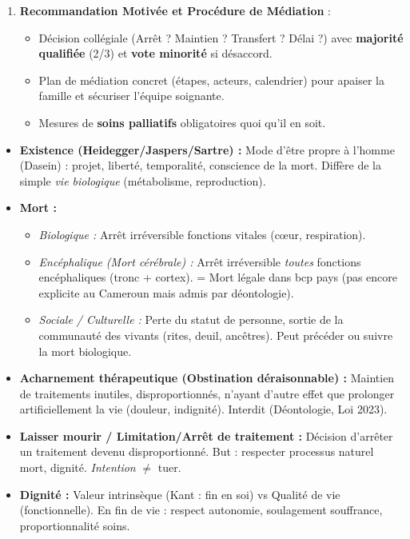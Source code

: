 \documentclass[11pt]{article}
\newcounter{popsec}
\newcounter{popsub}
\newcommand{\courssub}[1]{%
  \stepcounter{popsub}%
  \par\vspace{9pt}\noindent{\popxbold\fontsize{11.5}{13}\selectfont\color{popink}{\color{poporange}\thepopsec.\thepopsub}\hspace{6pt}#1}\par\nopagebreak\vspace{4pt}
}
\begin{document}
\begin{enumerate}
\begin{itemize}
        \item Proposer une \textbf{herméneutique du dialogue} : comment articuler droit positif et droit coutumier sans nier l'un ni l'autre ?
    \end{itemize}
    \item \textbf{Recommandation Motivée et Procédure de Médiation} : 
    \begin{itemize}
        \item Décision collégiale (Arrêt ? Maintien ? Transfert ? Délai ?) avec \textbf{majorité qualifiée} (2/3) et \textbf{vote minorité} si désaccord.
        \item Plan de médiation concret (étapes, acteurs, calendrier) pour apaiser la famille et sécuriser l'équipe soignante.
        \item Mesures de \textbf{soins palliatifs} obligatoires quoi qu'il en soit.
    \end{itemize}
\end{enumerate}

\courssub{Ressources à mobiliser}
\begin{definition}
\begin{itemize}
    \item \textbf{Existence (Heidegger/Jaspers/Sartre) :} Mode d'être propre à l'homme (Dasein) : projet, liberté, temporalité, conscience de la mort. Diffère de la simple \emph{vie biologique} (métabolisme, reproduction).
    \item \textbf{Mort :} 
    \begin{itemize}
        \item \emph{Biologique :} Arrêt irréversible fonctions vitales (cœur, respiration).
        \item \emph{Encéphalique (Mort cérébrale) :} Arrêt irréversible \emph{toutes} fonctions encéphaliques (tronc + cortex). = Mort légale dans bcp pays (pas encore explicite au Cameroun mais admis par déontologie).
        \item \emph{Sociale / Culturelle :} Perte du statut de personne, sortie de la communauté des vivants (rites, deuil, ancêtres). Peut précéder ou suivre la mort biologique.
    \end{itemize}
    \item \textbf{Acharnement thérapeutique (Obstination déraisonnable) :} Maintien de traitements inutiles, disproportionnés, n'ayant d'autre effet que prolonger artificiellement la vie (douleur, indignité). Interdit (Déontologie, Loi 2023).
    \item \textbf{Laisser mourir / Limitation/Arrêt de traitement :} Décision d'arrêter un traitement devenu disproportionné. But : respecter processus naturel mort, dignité. \emph{Intention} $\neq$ tuer.
    \item \textbf{Dignité :} Valeur intrinsèque (Kant : fin en soi) vs Qualité de vie (fonctionnelle). En fin de vie : respect autonomie, soulagement souffrance, proportionnalité soins.
\end{itemize}
\end{definition}
\end{document}
